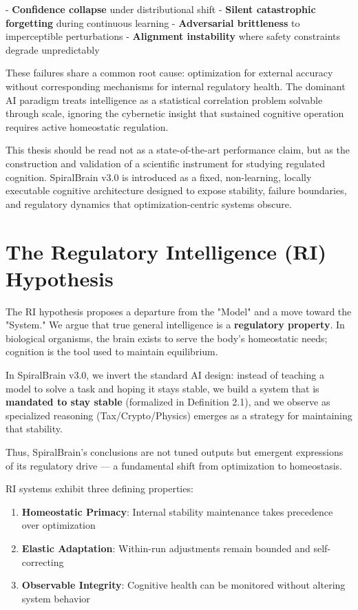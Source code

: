 \documentclass[12pt,a4paper]{report}
\begin{document}
- \textbf{Confidence collapse} under distributional shift
- \textbf{Silent catastrophic forgetting} during continuous learning
- \textbf{Adversarial brittleness} to imperceptible perturbations
- \textbf{Alignment instability} where safety constraints degrade unpredictably

These failures share a common root cause: optimization for external accuracy without corresponding mechanisms for internal regulatory health. The dominant AI paradigm treats intelligence as a statistical correlation problem solvable through scale, ignoring the cybernetic insight that sustained cognitive operation requires active homeostatic regulation.

This thesis should be read not as a state-of-the-art performance claim, but as the construction and validation of a scientific instrument for studying regulated cognition. SpiralBrain v3.0 is introduced as a fixed, non-learning, locally executable cognitive architecture designed to expose stability, failure boundaries, and regulatory dynamics that optimization-centric systems obscure.

\section{The Regulatory Intelligence (RI) Hypothesis}

The RI hypothesis proposes a departure from the "Model" and a move toward the "System." We argue that true general intelligence is a \textbf{regulatory property}. In biological organisms, the brain exists to serve the body's homeostatic needs; cognition is the tool used to maintain equilibrium.

In SpiralBrain v3.0, we invert the standard AI design: instead of teaching a model to solve a task and hoping it stays stable, we build a system that is \textbf{mandated to stay stable} (formalized in Definition 2.1), and we observe as specialized reasoning (Tax/Crypto/Physics) emerges as a strategy for maintaining that stability.

Thus, SpiralBrain's conclusions are not tuned outputs but emergent expressions of its regulatory drive — a fundamental shift from optimization to homeostasis.

RI systems exhibit three defining properties:

\begin{enumerate}
    \item \textbf{Homeostatic Primacy}: Internal stability maintenance takes precedence over optimization
    \item \textbf{Elastic Adaptation}: Within-run adjustments remain bounded and self-correcting
    \item \textbf{Observable Integrity}: Cognitive health can be monitored without altering system behavior
\end{enumerate}
\end{document}
